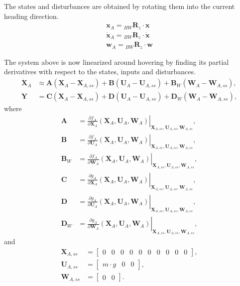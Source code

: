 The states and disturbances are obtained by rotating them into the current heading direction.
\begin{align}
\mathbf{x}_A = {_{BW}{\mathbf{R}}_z} \cdot \mathbf{x} \\
{\dot{\mathbf{x}}}_A = {_{BW}{\mathbf{R}}_z} \cdot \dot{\mathbf{x}} \\
{\mathbf{w}}_A = {_{BW}{\mathbf{R}}_z} \cdot \mathbf{w}
\end{align}

The system above is now linearized around hovering by finding its partial derivatives with respect to the states, inputs and disturbances. 
\begin{align}
\dot{\mathbf{X}}_A &\approx \mathbf{A} \left( \mathbf{X}_A - \mathbf{X}_{A,ss} \right) + \mathbf{B} \left( \mathbf{U}_A - \mathbf{U}_{A,ss} \right) + \mathbf{B}_W \left( \mathbf{W}_A - \mathbf{W}_{A,ss} \right) \label{eq:lin_sys_dt}, \\
\mathbf{Y} &= \mathbf{C} \left( \mathbf{X}_A - \mathbf{X}_{A,ss} \right) +  \mathbf{D} \left( \mathbf{U}_A - \mathbf{U}_{A,ss} \right)  +  \mathbf{D}_W \left( \mathbf{W}_A - \mathbf{W}_{A,ss} \right),
\end{align}
where
\begin{align}
\mathbf{A} &= \left.{\frac{\partial f_A}{\partial \mathbf{X}_A} \left( \mathbf{X}_A,\mathbf{U}_A, \mathbf{W}_A \right) }\right|_{\mathbf{X}_{A,ss}, \mathbf{U}_{A,ss}, \mathbf{W}_{A,ss}}, \\
\mathbf{B} &= \left.{\frac{\partial f_A}{\partial \mathbf{U}_A} \left( \mathbf{X}_A,\mathbf{U}_A, \mathbf{W}_A \right) }\right|_{\mathbf{X}_{A,ss}, \mathbf{U}_{A,ss}, \mathbf{W}_{A,ss}}, \\
\mathbf{B}_W &= \left.{\frac{\partial f_A}{\partial \mathbf{W}_A} \left( \mathbf{X}_A,\mathbf{U}_A, \mathbf{W}_A \right) }\right|_{\mathbf{X}_{A,ss}, \mathbf{U}_{A,ss}, \mathbf{W}_{A,ss}}, \\
\mathbf{C} &= \left.{\frac{\partial g_A}{\partial \mathbf{X}_A} \left( \mathbf{X}_A,\mathbf{U}_A, \mathbf{W}_A \right) }\right|_{\mathbf{X}_{A,ss}, \mathbf{U}_{A,ss}, \mathbf{W}_{A,ss}}, \\
\mathbf{D} &= \left.{\frac{\partial g_A}{\partial \mathbf{U}_A} \left( \mathbf{X}_A,\mathbf{U}_A, \mathbf{W}_A \right) }\right|_{\mathbf{X}_{A,ss}, \mathbf{U}_{A,ss}, \mathbf{W}_{A,ss}}, \\
\mathbf{D}_W &= \left.{\frac{\partial g_A}{\partial \mathbf{W}_A} \left( \mathbf{X}_A,\mathbf{U}_A, \mathbf{W}_A \right) }\right|_{\mathbf{X}_{A,ss}, \mathbf{U}_{A,ss}, \mathbf{W}_{A,ss}} ,
\end{align}
and
\begin{align}
\mathbf{X}_{A,ss} &= \begin{bmatrix}
0 & 0 & 0 & 0 & 0 & 0 & 0 & 0 & 0 & 0
\end{bmatrix} ,\\
\mathbf{U}_{A,ss} &= \begin{bmatrix}
m \cdot g & 0 & 0
\end{bmatrix} ,\\ 
\mathbf{W}_{A,ss} &= \begin{bmatrix}
0 & 0 
\end{bmatrix}.
\end{align}

